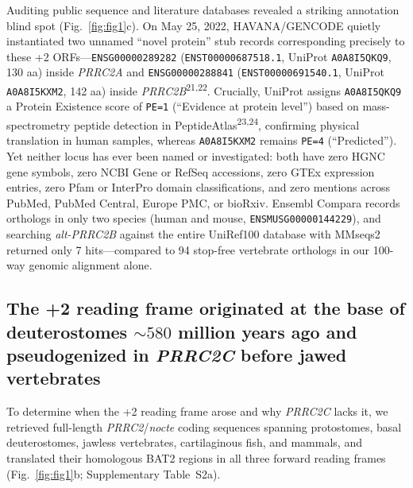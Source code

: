 \documentclass[10pt,letterpaper]{article}
\newcommand{\gene}[1]{\textit{#1}}
\newcommand{\refsup}[1]{\textsuperscript{#1}}
\begin{document}
Auditing public sequence and literature databases revealed a striking annotation blind spot (Fig.~\ref{fig:fig1}c). On May 25, 2022, HAVANA/GENCODE quietly instantiated two unnamed ``novel protein'' stub records corresponding precisely to these +2 ORFs---\texttt{ENSG00000289282} (\texttt{ENST00000687518.1}, UniProt \texttt{A0A8I5QKQ9}, 130 aa) inside \gene{PRRC2A} and \texttt{ENSG00000288841} (\texttt{ENST00000691540.1}, UniProt \texttt{A0A8I5KXM2}, 142 aa) inside \gene{PRRC2B}\refsup{21,22}. Crucially, UniProt assigns \texttt{A0A8I5QKQ9} a Protein Existence score of \texttt{PE=1} (``Evidence at protein level'') based on mass-spectrometry peptide detection in PeptideAtlas\refsup{23,24}, confirming physical translation in human samples, whereas \texttt{A0A8I5KXM2} remains \texttt{PE=4} (``Predicted''). Yet neither locus has ever been named or investigated: both have zero HGNC gene symbols, zero NCBI Gene or RefSeq accessions, zero GTEx expression entries, zero Pfam or InterPro domain classifications, and zero mentions across PubMed, PubMed Central, Europe PMC, or bioRxiv. Ensembl Compara records orthologs in only two species (human and mouse, \texttt{ENSMUSG00000144229}), and searching \gene{alt-PRRC2B} against the entire UniRef100 database with MMseqs2 returned only 7 hits---compared to 94 stop-free vertebrate orthologs in our 100-way genomic alignment alone.

\subsection{The +2 reading frame originated at the base of deuterostomes $\sim 580$ million years ago and pseudogenized in \gene{PRRC2C} before jawed vertebrates}

To determine when the +2 reading frame arose and why \gene{PRRC2C} lacks it, we retrieved full-length \gene{PRRC2}/\gene{nocte} coding sequences spanning protostomes, basal deuterostomes, jawless vertebrates, cartilaginous fish, and mammals, and translated their homologous BAT2 regions in all three forward reading frames (Fig.~\ref{fig:fig1}b; Supplementary Table~S2a).
\end{document}
